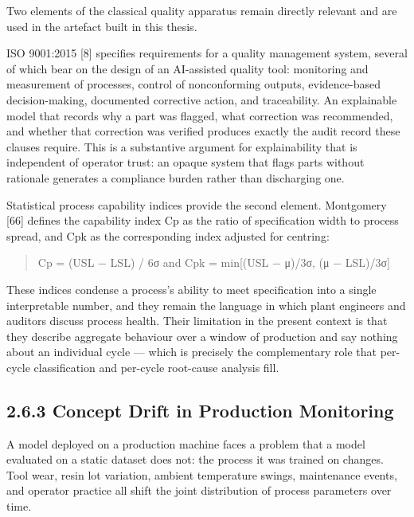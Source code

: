 Two elements of the classical quality apparatus remain directly relevant and are used in the artefact built in this thesis.

ISO 9001:2015 {[}8{]} specifies requirements for a quality management system, several of which bear on the design of an AI-assisted quality tool: monitoring and measurement of processes, control of nonconforming outputs, evidence-based decision-making, documented corrective action, and traceability. An explainable model that records why a part was flagged, what correction was recommended, and whether that correction was verified produces exactly the audit record these clauses require. This is a substantive argument for explainability that is independent of operator trust: an opaque system that flags parts without rationale generates a compliance burden rather than discharging one.

Statistical process capability indices provide the second element. Montgomery {[}66{]} defines the capability index Cp as the ratio of specification width to process spread, and Cpk as the corresponding index adjusted for centring:

\begin{quote}
Cp = (USL − LSL) / 6σ and Cpk = min{[}(USL − μ)/3σ, (μ − LSL)/3σ{]}
\end{quote}

These indices condense a process's ability to meet specification into a single interpretable number, and they remain the language in which plant engineers and auditors discuss process health. Their limitation in the present context is that they describe aggregate behaviour over a window of production and say nothing about an individual cycle --- which is precisely the complementary role that per-cycle classification and per-cycle root-cause analysis fill.

\hypertarget{concept-drift-in-production-monitoring}{%
\subsection{2.6.3 Concept Drift in Production Monitoring}\label{concept-drift-in-production-monitoring}}

A model deployed on a production machine faces a problem that a model evaluated on a static dataset does not: the process it was trained on changes. Tool wear, resin lot variation, ambient temperature swings, maintenance events, and operator practice all shift the joint distribution of process parameters over time.

